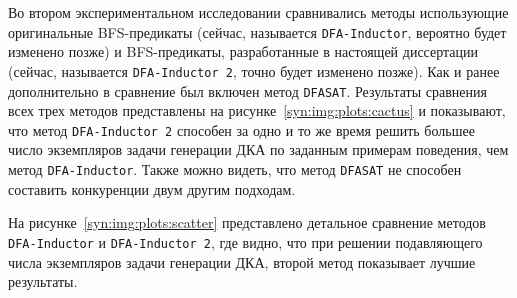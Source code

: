 \begin{table}[ht]
  \caption{Медианное время работы методов генерации ДКА по заданным примерам поведения с использованием BFS-предикатов нарушения симметрии, DFS-предикатов нарушения симметрии и метода \texttt{DFASAT} в секундах. Время работы методов было ограничено одним часом ($\text{TL} = 3600\,\, \text{секунд}$)}
  \centering
  \label{syn:tab:DFS-results}
\end{table}

Во втором экспериментальном исследовании сравнивались методы использующие оригинальные BFS-предикаты (сейчас, называется \texttt{DFA-Inductor}, вероятно будет изменено позже) и BFS-предикаты, разработанные в настоящей диссертации (сейчас, называется \texttt{DFA-Inductor~2}, точно будет изменено позже).
Как и ранее дополнительно в сравнение был включен метод \texttt{DFASAT}.
Результаты сравнения всех трех методов представлены на рисунке~\ref{syn:img:plots:cactus} и показывают, что метод \texttt{DFA-Inductor~2} способен за одно и то же время решить большее число экземпляров задачи генерации ДКА по заданным примерам поведения, чем метод \texttt{DFA-Inductor}.
Также можно видеть, что метод \texttt{DFASAT} не способен составить конкуренции двум другим подходам.

На рисунке~\ref{syn:img:plots:scatter} представлено детальное сравнение методов \texttt{DFA-Inductor} и \texttt{DFA-Inductor~2}, где видно, что при решении подавляющего числа экземпляров задачи генерации ДКА, второй метод показывает лучшие результаты.


